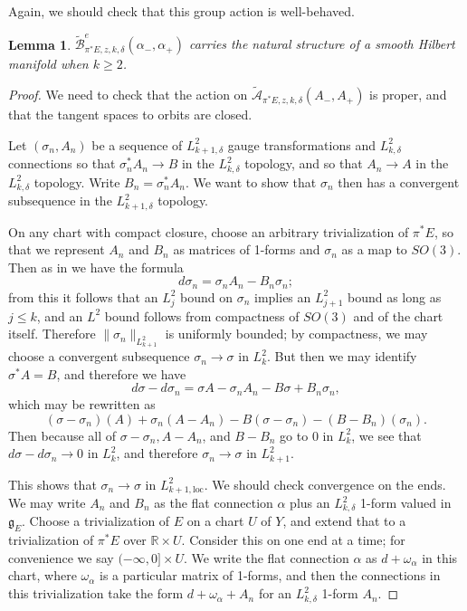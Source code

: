 \documentclass[10pt,a4paper]{amsart}
\newcommand{\pE}{\pi^* \! E}
\newtheorem{lemma}[theorem]{Lemma}
\theoremstyle{definition}
\theoremstyle{remark}
\numberwithin{figure}{qchap}
\begin{document}
Again, we should check that this group action is well-behaved.

\begin{lemma}$\widetilde{\mathcal B}^{e}_{\pE, z, k, \delta}(\alpha_-, \alpha_+)$ carries the natural structure of a smooth Hilbert manifold when $k \geq 2$. 
\end{lemma}
\begin{proof}
We need to check that the action on $\widetilde{\mathcal A}_{\pE,z,k,\delta}(A_-, A_+)$ is proper, and that the tangent spaces to orbits are closed. 

Let $(\sigma_n, A_n)$ be a sequence of $L^2_{k+1,\delta}$ gauge transformations and $L^2_{k,\delta}$ connections so that $\sigma_n^*A_n \to B$ in the $L^2_{k,\delta}$ topology, and so that $A_n \to A$ in the $L^2_{k,\delta}$ topology. Write $B_n = \sigma_n^* A_n$. We want to show that $\sigma_n$ then has a convergent subsequence in the $L^2_{k+1,\delta}$ topology.

On any chart with compact closure, choose an arbitrary trivialization of $\pE$, so that we represent $A_n$ and $B_n$ as matrices of 1-forms and $\sigma_n$ as a map to $SO(3)$. Then as in \cite[Section~2.3.7]{DK} we have the formula
$$d\sigma_n = \sigma_n A_n - B_n \sigma_n;$$ 
from this it follows that an $L^2_j$ bound on $\sigma_n$ implies an $L^2_{j+1}$ bound as long as $j \leq k$, and an $L^2$ bound follows from compactness of $SO(3)$ and of the chart itself. Therefore $\|\sigma_n\|_{L^2_{k+1}}$ is uniformly bounded; by compactness, we may choose a convergent subsequence $\sigma_n \to \sigma$ in $L^2_k$. But then we may identify $\sigma^*A = B$, and therefore we have $$d\sigma - d\sigma_n = \sigma A - \sigma_n A_n - B \sigma + B_n \sigma_n,$$ which may be rewritten as $$(\sigma - \sigma_n)(A) + \sigma_n(A-A_n) - B(\sigma - \sigma_n) - (B - B_n)(\sigma_n).$$ Then because all of $\sigma - \sigma_n, A - A_n$, and $B - B_n$  go to $0$ in $L^2_k$, we see that $d\sigma - d\sigma_n \to 0$ in $L^2_k$, and therefore $\sigma_n \to \sigma$ in $L^2_{k+1}$.

This shows that $\sigma_n \to \sigma$ in $L^2_{k+1,\text{loc}}$. We should check convergence on the ends. We may write $A_n$ and $B_n$ as the flat connection $\alpha$ plus an $L^2_{k,\delta}$ 1-form valued in $\mathfrak g_E$. Choose a trivialization of $E$ on a chart $U$ of $Y$, and extend that to a trivialization of $\pE$ over $\mathbb R \times U$. Consider this on one end at a time; for convenience we say $(-\infty, 0] \times U$. We write the flat connection $\alpha$ as $d + \omega_\alpha$ in this chart, where $\omega_\alpha$ is a particular matrix of 1-forms, and then the connections in this trivialization take the form $d + \omega_\alpha + A_n$ for an $L^2_{k,\delta}$ 1-form $A_n$.


\end{proof}
\end{document}
